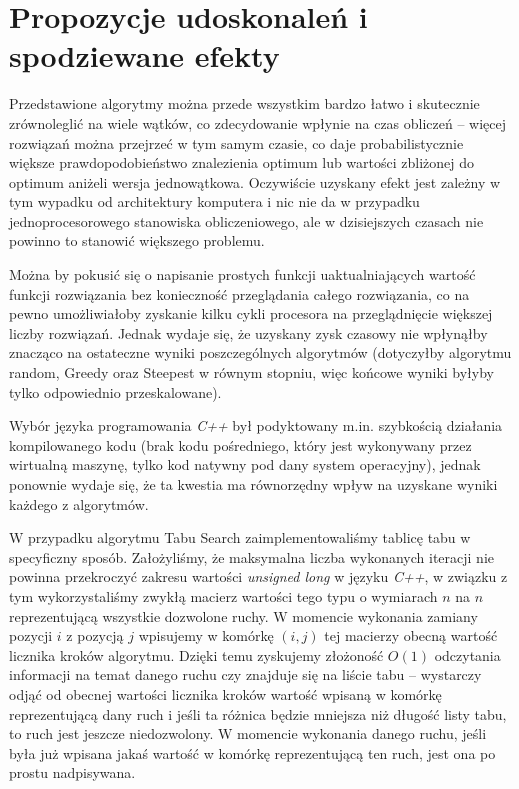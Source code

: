 \section{Propozycje udoskonaleń i spodziewane efekty}
Przedstawione algorytmy można przede wszystkim bardzo łatwo i skutecznie zrównoleglić na wiele wątków, co zdecydowanie wpłynie na czas obliczeń -- więcej rozwiązań można przejrzeć w tym samym czasie, co daje probabilistycznie większe prawdopodobieństwo znalezienia optimum lub wartości zbliżonej do optimum aniżeli wersja jednowątkowa. Oczywiście uzyskany efekt jest zależny w tym wypadku od architektury komputera i nic nie da w przypadku jednoprocesorowego stanowiska obliczeniowego, ale w dzisiejszych czasach nie powinno to stanowić większego problemu.

Można by pokusić się o napisanie prostych funkcji uaktualniających wartość funkcji rozwiązania bez konieczność przeglądania całego rozwiązania, co na pewno umożliwiałoby zyskanie kilku cykli procesora na przeglądnięcie większej liczby rozwiązań. Jednak wydaje się, że uzyskany zysk czasowy nie wpłynąłby znacząco na ostateczne wyniki poszczególnych algorytmów (dotyczyłby algorytmu random, Greedy oraz Steepest w równym stopniu, więc końcowe wyniki byłyby tylko odpowiednio przeskalowane).

Wybór języka programowania \emph{C++} był podyktowany m.in. szybkością działania kompilowanego kodu (brak kodu pośredniego, który jest wykonywany przez wirtualną maszynę, tylko kod natywny pod dany system operacyjny), jednak ponownie wydaje się, że ta kwestia ma równorzędny wpływ na uzyskane wyniki każdego z algorytmów.

W przypadku algorytmu Tabu Search zaimplementowaliśmy tablicę tabu w specyficzny sposób. Założyliśmy, że maksymalna liczba wykonanych iteracji nie powinna przekroczyć zakresu wartości \textit{unsigned long} w języku \emph{C++}, w związku z tym wykorzystaliśmy zwykłą macierz wartości tego typu o wymiarach $n$ na $n$ reprezentującą wszystkie dozwolone ruchy. W momencie wykonania zamiany pozycji $i$ z pozycją $j$ wpisujemy w komórkę $(i,j)$ tej macierzy obecną wartość licznika kroków algorytmu. Dzięki temu zyskujemy złożoność $O(1)$ odczytania informacji na temat danego ruchu czy znajduje się na liście tabu -- wystarczy odjąć od obecnej wartości licznika kroków wartość wpisaną w komórkę reprezentującą dany ruch i jeśli ta różnica będzie mniejsza niż długość listy tabu, to ruch jest jeszcze niedozwolony. W momencie wykonania danego ruchu, jeśli była już wpisana jakaś wartość w komórkę reprezentującą ten ruch, jest ona po prostu nadpisywana.


